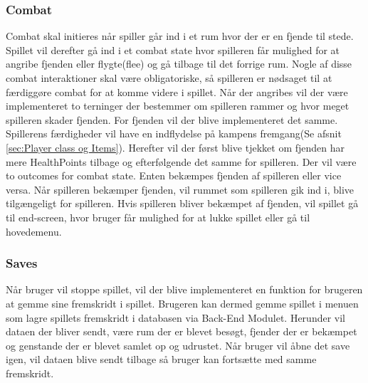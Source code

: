 \subsubsection{Combat}
\label{sec:Combat-design}
Combat skal initieres når spiller går ind i et rum hvor der er en fjende til stede. Spillet vil derefter gå ind i et combat state hvor spilleren får mulighed for at angribe fjenden eller flygte(flee) og gå tilbage til det forrige rum. Nogle af disse combat interaktioner skal være obligatoriske, så spilleren er nødsaget til at færdiggøre combat for at komme videre i spillet. Når der angribes vil der være implementeret to terninger der bestemmer om spilleren rammer og hvor meget spilleren skader fjenden. For fjenden vil der blive implementeret det samme. Spillerens færdigheder vil have en indflydelse på kampens fremgang(Se afsnit \autoref{sec:Player class og Items}). Herefter vil der først blive tjekket om fjenden har mere HealthPoints tilbage og efterfølgende det samme for spilleren. Der vil være to outcomes for combat state. Enten bekæmpes fjenden af spilleren eller vice versa. Når spilleren bekæmper fjenden, vil rummet som spilleren gik ind i, blive tilgængeligt for spilleren. Hvis spilleren bliver bekæmpet af fjenden, vil spillet gå til end-screen, hvor bruger får mulighed for at lukke spillet eller gå til hovedemenu.

\subsubsection{Saves}
Når bruger vil stoppe spillet, vil der blive implementeret en funktion for brugeren at gemme sine fremskridt i spillet. Brugeren kan dermed gemme spillet i menuen som lagre spillets fremskridt i databasen via Back-End Modulet. Herunder vil dataen der bliver sendt, være rum der er blevet besøgt, fjender der er bekæmpet og genstande der er blevet samlet op og udrustet. Når bruger vil åbne det save igen, vil dataen blive sendt tilbage så bruger kan fortsætte med samme fremskridt.
